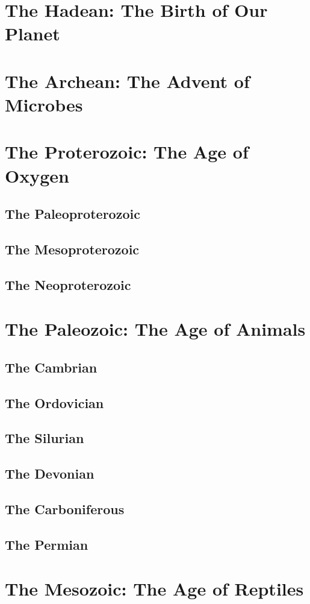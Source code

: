 \documentclass[10pt]{report}
\begin{document}
	
	\tableofcontents
	\chapter{The Hadean: The Birth of Our Planet}
	\chapter{The Archean: The Advent of Microbes}
	\chapter{The Proterozoic: The Age of Oxygen}
	\section{The Paleoproterozoic}
	\section{The Mesoproterozoic}
	\section{The Neoproterozoic}
	\chapter{The Paleozoic: The Age of Animals}
	\section{The Cambrian}
	\section{The Ordovician}
	\section{The Silurian}
	\section{The Devonian}
	\section{The Carboniferous}
	\section{The Permian}
	\chapter{The Mesozoic: The Age of Reptiles}
\end{document}
